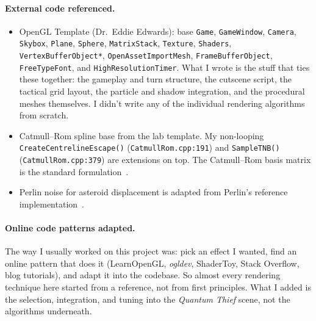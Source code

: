 \documentclass[11pt,a4paper]{article}
\begin{document}
\paragraph{External code referenced.}
\begin{itemize}
  \item OpenGL Template (Dr.~Eddie Edwards): base \texttt{Game},
        \texttt{GameWindow}, \texttt{Camera}, \texttt{Skybox}, \texttt{Plane},
        \texttt{Sphere}, \texttt{MatrixStack}, \texttt{Texture},
        \texttt{Shaders}, \texttt{VertexBufferObject*},
        \texttt{OpenAssetImportMesh}, \texttt{FrameBufferObject},
        \texttt{FreeTypeFont}, and \texttt{HighResolutionTimer}. What I
        wrote is the stuff that ties these together: the gameplay and turn
        structure, the cutscene script, the tactical grid layout, the
        particle and shadow integration, and the procedural meshes
        themselves. I didn't write any of the individual rendering
        algorithms from scratch.
  \item Catmull--Rom spline base from the lab template. My non-looping
        \texttt{CreateCentrelineEscape()} (\texttt{CatmullRom.cpp:191}) and
        \texttt{SampleTNB()} (\texttt{CatmullRom.cpp:379}) are extensions on
        top. The Catmull--Rom basis matrix is the standard
        formulation~\cite{wikipedia_catmullrom,catmullrom1974}.
  \item Perlin noise for asteroid displacement is adapted from Perlin's
        reference implementation~\cite{perlin2002}.
\end{itemize}

\paragraph{Online code patterns adapted.}
The way I usually worked on this project was: pick an effect I wanted, find
an online pattern that does it (LearnOpenGL, \emph{ogldev}, ShaderToy,
Stack Overflow, blog tutorials), and adapt it into the codebase. So almost
every rendering technique here started from a reference, not from first
principles. What I added is the selection, integration, and tuning into
the \textit{Quantum Thief} scene, not the algorithms underneath.
\end{document}

